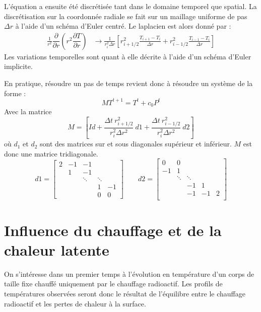 \documentclass[10pt,a4paper]{article}
\numberwithin{equation}{section}
\begin{document}
L'équation a ensuite été discrétisée tant dans le domaine temporel que spatial. La discrétisation sur la coordonnée radiale se fait sur un maillage uniforme de pas $\Delta r$ à l'aide d'un schéma d'Euler centré. Le laplacien est alors donné par :
\begin{align}
\frac{1}{r^2} \dfrac{\partial }{\partial r}\left( r^2 \dfrac{\partial T}{\partial r} \right) &\rightarrow \frac{1}{r^2_i \Delta r}\left[ r^2_{i+1/2}\frac{T_{i+1} - T_{i}}{\Delta r} + r^2_{i-1/2}\frac{T_{i-1} - T_{i}}{\Delta r} \right]
\end{align}
Les variations temporelles sont quant à elle décrite à l'aide d'un schéma d'Euler implicite.
\medskip

En pratique, résoudre un pas de temps revient donc à résoudre un système de la forme :
\begin{equation}
MT^{t+1} = T^t + c_0 P^{t}
\end{equation}
Avec la matrice $$M = \left[ Id + \frac{\Delta t ~ r^2_{i+1/2}}{r^2_i \Delta r^2} ~ d1 + \frac{\Delta t ~ r^2_{i-1/2}}{r^2_i \Delta r^2} ~ d2  \right]$$
où $d_1$ et $d_2$ sont des matrices sur et sous diagonales supérieur et inférieur. $M$ est donc une matrice tridiagonale.
$$
d1=
\begin{bmatrix}
    2      & -1     & -1       &   \\
           &  1     & -1              &             \\
     &        & \ddots    &\ddots       \\
     &        &            & 1 & -1         \\
         &   &      &   0         &  0
\end{bmatrix}
\qquad
d2=
\begin{bmatrix}
     0     & 0      &   &     &        \\
    -1     & 1      &  &          &            \\
     & \ddots & \ddots &    &      \\
     &              &  -1      &  1         \\
         &      &  -1     & -1        & 2 \\
\end{bmatrix}
$$

\section{Influence du chauffage et de la chaleur latente}
On s'intéresse dans un premier temps à l'évolution en température d'un corps de taille fixe chauffé uniquement par le chauffage radioactif. Les profils de températures observées seront donc le résultat de l'équilibre entre le chauffage radioactif et les pertes de chaleur à la surface.
\end{document}
